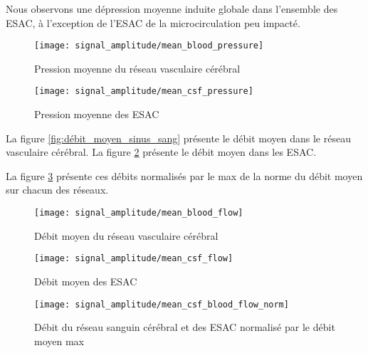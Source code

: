 \documentclass[french]{report}
\begin{document}
Nous observons une dépression moyenne induite globale dans l'ensemble des ESAC, à l'exception de l'ESAC de la microcirculation peu impacté.
 
\begin{figure}
  \begin{minipage}{0.5\linewidth}
    \centering
    \texttt{[image: signal\_amplitude/mean\_blood\_pressure]}
    \caption{Pression moyenne du réseau vasculaire cérébral}
    \label{fig:pression_moyen_sinus_sang}
  \end{minipage}
  \hspace{0.5cm}
  \begin{minipage}{0.5\linewidth}
    \centering
    \texttt{[image: signal\_amplitude/mean\_csf\_pressure]}
    \caption{Pression moyenne des ESAC}
    \label{fig:pression_moyen_sinus_sas}
  \end{minipage}
  
\end{figure}

La figure \ref{fig:débit_moyen_sinus_sang} présente le débit moyen dans le réseau vasculaire cérébral.
La figure \ref{fig:débit_moyen_sinus_sas} présente le débit moyen dans les ESAC.

La figure \ref{fig:débit_moyen_sinus_sang_sas} présente ces débits normalisés par le max de la norme du débit moyen sur chacun des réseaux.

\begin{figure}
  \begin{minipage}{0.5\linewidth}
    \centering
    \texttt{[image: signal\_amplitude/mean\_blood\_flow]}
    \caption{Débit moyen du réseau vasculaire cérébral}
    \label{fig:débit_moyen_sinus_sang}
  \end{minipage}
  \hspace{0.5cm}
  \begin{minipage}{0.5\linewidth}
    \centering
    \texttt{[image: signal\_amplitude/mean\_csf\_flow]}
    \caption{Débit moyen des ESAC}
    \label{fig:débit_moyen_sinus_sas}
  \end{minipage}
  
\end{figure}

\begin{figure}
\centering
\texttt{[image: signal\_amplitude/mean\_csf\_blood\_flow\_norm]}
\caption{Débit du réseau sanguin cérébral et des ESAC normalisé par le débit moyen max}
    \label{fig:débit_moyen_sinus_sang_sas}
\end{figure}
\end{document}
